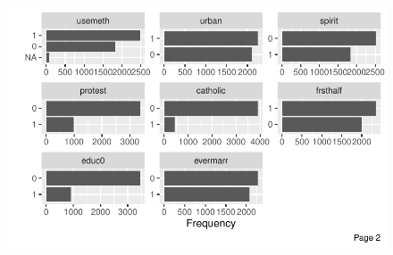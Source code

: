 \documentclass[
  letterpaper,
  DIV=11,
  numbers=noendperiod]{scrartcl}
\begin{document}
\begin{figure}[H]

{\centering \includegraphics{Fertility_Rates_Education_Impact_Botswana_files/figure-pdf/unnamed-chunk-30-2.pdf}

}

\end{figure}
\end{document}
